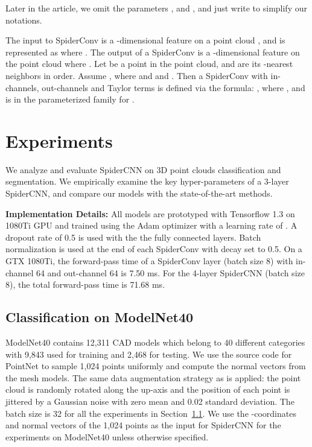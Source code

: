 \documentclass[runningheads]{llncs}
\begin{document}
Later in the article, we omit the parameters ,  and , and just write  to simplify our notations.

The input to SpiderConv is a -dimensional feature on a point cloud , and is represented as  where . The output of a SpiderConv is a -dimensional feature on the point cloud  where . 
Let  be a point in the point cloud, and  are its -nearest neighbors in order. Assume , where  and  and . Then a SpiderConv with  in-channels,  out-channels and  Taylor terms is defined via the formula:
,
where 
,
and  is in the parameterized family  for .


\section{Experiments} \label{experiments}
We analyze and evaluate SpiderCNN on 3D point clouds classification and segmentation. We empirically examine the key hyper-parameters of a 3-layer SpiderCNN, and compare our models with the state-of-the-art methods.

{\noindent \bf Implementation Details:} All models are prototyped with Tensorflow 1.3 on 1080Ti GPU and trained using the Adam optimizer with a learning rate of . A dropout rate of 0.5 is used with the the fully connected layers. Batch normalization is used at the end of each SpiderConv with decay set to 0.5. 
On a GTX 1080Ti, the forward-pass time of a SpiderConv layer (batch size 8) with in-channel 64 and out-channel 64 is 7.50 ms. For the 4-layer SpiderCNN (batch size 8), the total forward-pass time is 71.68 ms. 

\subsection{Classification on ModelNet40} \label{modelnet}

ModelNet40 \cite{chang2015shapenet} contains 12,311 CAD models which belong to 40 different categories with 9,843 used for training and 2,468 for testing. We use the source code for PointNet\cite{qi2017pointnet} to sample 1,024 points uniformly and compute the normal vectors from the mesh models. The same data augmentation strategy as \cite{qi2017pointnet} is applied: the point cloud is randomly rotated along the up-axis and the position of each point is jittered by a Gaussian noise with zero mean and 0.02 standard deviation. The batch size is 32 for all the experiments in Section~\ref{modelnet}. We use the -coordinates and normal vectors of the 1,024 points as the input for SpiderCNN for the experiments on ModelNet40 unless otherwise specified. 
\end{document}
